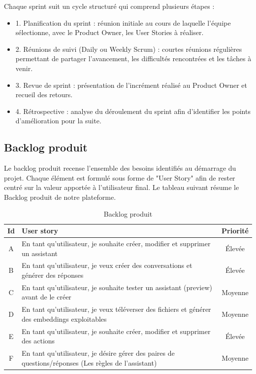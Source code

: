 Chaque sprint suit un cycle structuré qui comprend plusieurs étapes :
\begin{itemize}[label={}]
    \item 1. Planification du sprint : réunion initiale au cours de laquelle l’équipe sélectionne, avec le Product Owner, les User Stories à réaliser.
    \item 2. Réunions de suivi (Daily ou Weekly Scrum) : courtes réunions régulières permettant de partager l’avancement, les difficultés rencontrées et les tâches à venir.
    \item 3. Revue de sprint : présentation de l’incrément réalisé au Product Owner et recueil des retours.
    \item 4. Rétrospective : analyse du déroulement du sprint afin d’identifier les points d’amélioration pour la suite.
\end{itemize}
\subsection{Backlog produit}
Le backlog produit recense l’ensemble des besoins identifiés au démarrage du projet. Chaque élément est formulé sous forme de "User Story" afin de rester centré sur la valeur apportée à l'utilisateur final. Le tableau suivant résume le Backlog produit de notre plateforme.
\begin{table}[H]
\centering
\caption{Backlog produit}
\begin{tabular}{|c|p{9cm}|c|}
\hline
\textbf{Id} & \textbf{User story} & \textbf{Priorité}  \\ \hline
A & En tant qu’utilisateur, je souhaite créer, modifier et supprimer un assistant & Élevée \\ \hline
B & En tant qu’utilisateur, je veux créer des conversations et générer des réponses & Élevée  \\ \hline
C & En tant qu’utilisateur, je souhaite tester un assistant (preview) avant de le créer & Moyenne  \\
\hline
D & En tant qu’utilisateur, je veux téléverser des fichiers et générer des embeddings exploitables & Moyenne  \\ \hline
E & En tant qu’utilisateur, je souhaite créer, modifier et supprimer des actions & Élevée \\ \hline
F & En tant qu’utilisateur, je désire gérer des paires de questions/réponses (Les règles de  l'assistant) & Moyenne \\ \hline
\end{tabular}
\end{table}
